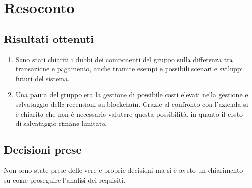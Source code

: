 \section{Resoconto}

\subsection{Risultati ottenuti}
\begin{enumerate}
    \item Sono stati chiariti i dubbi dei componenti del gruppo sulla differenza tra transazione e pagamento, anche tramite esempi e possibili scenari e sviluppi futuri del sistema.
    \item Una paura del gruppo era la gestione di possibile costi elevati nella gestione e salvataggio delle recensioni su blockchain. Grazie al confronto con l'azienda si è chiarito che non è necessario valutare questa possibilità, in quanto il costo di salvataggio rimane limitato.
\end{enumerate}

\subsection{Decisioni prese}
Non sono state prese delle vere e proprie decisioni ma si è avuto un chiarimento su come proseguire l'analisi dei requisiti.
